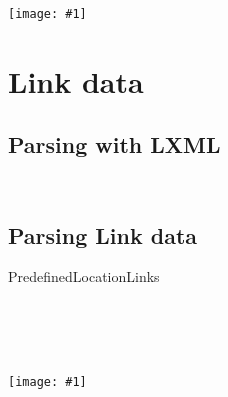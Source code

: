 \documentclass[aspectratio=169]{beamer}
\newcommand{\tallimage}[1]{%
  \begin{frame}
    \centering
    \texttt{[image: \#1]}
    \\
  \end{frame}
}
\newcommand{\wideimage}[1]{%
  \begin{frame}
    \centering
    \texttt{[image: \#1]}
    \\
  \end{frame}
}
\begin{document}
\tallimage{img/datex2.png}

\section{Link data}

\subsection{Parsing with LXML}
\begin{frame}
  \inputminted{xml}{document.xml}
  \vspace{\baselineskip}
  \inputminted{python}{lxml_objectify.py}
\end{frame}

\subsection{Parsing Link data}
\begin{frame}
  \centering\Huge
  PredefinedLocationLinks
  \\
\end{frame}

\begin{frame}
  \inputminted{xml}{PredefinedLocationLinks/structure.xml}
\end{frame}

\begin{frame}
  \inputminted{xml}{PredefinedLocationLinks/location.xml}
\end{frame}

\begin{frame}
  \inputminted{python}{PredefinedLocationLinks/structure.py}
\end{frame}

\begin{frame}
  \inputminted{python}{PredefinedLocationLinks/structure_out.py}
\end{frame}

\begin{frame}
  \inputminted{python}{wgs84-links.py}
\end{frame}

\wideimage{img/wgs84-links.pdf}

\begin{frame}
  \inputminted[lastline=7]{python}{bng-links.py}
\end{frame}

\begin{frame}
  \inputminted[firstline=9, lastline=19]{python}{bng-links.py}
\end{frame}
\end{document}
